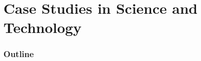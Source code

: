 \renewcommand{\prevpart}{10 }
\renewcommand{\thispart}{11 }
\renewcommand{\nextpart}{12 }
\renewcommand{\thispartname}{Case Studies in Science and Technology}

\part{\thispartname}

\section{Outline}



